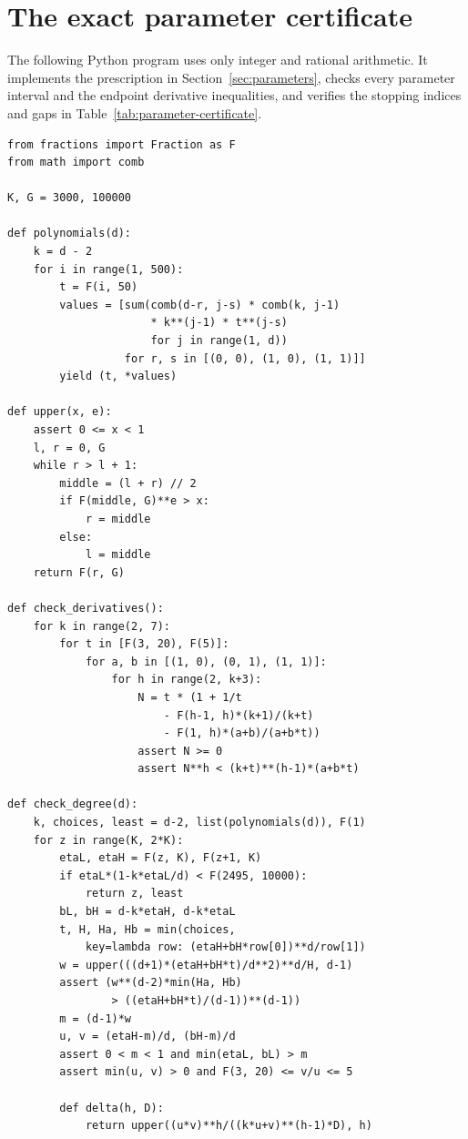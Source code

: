 \section{The exact parameter certificate}
\label{app:certificate}

The following Python program uses only integer and rational arithmetic.
It implements the prescription in Section~\ref{sec:parameters}, checks
every parameter interval and the endpoint derivative inequalities, and
verifies the stopping indices and gaps in
Table~\ref{tab:parameter-certificate}.

\begingroup\footnotesize
\begin{verbatim}
from fractions import Fraction as F
from math import comb

K, G = 3000, 100000

def polynomials(d):
    k = d - 2
    for i in range(1, 500):
        t = F(i, 50)
        values = [sum(comb(d-r, j-s) * comb(k, j-1)
                      * k**(j-1) * t**(j-s)
                      for j in range(1, d))
                  for r, s in [(0, 0), (1, 0), (1, 1)]]
        yield (t, *values)

def upper(x, e):
    assert 0 <= x < 1
    l, r = 0, G
    while r > l + 1:
        middle = (l + r) // 2
        if F(middle, G)**e > x:
            r = middle
        else:
            l = middle
    return F(r, G)

def check_derivatives():
    for k in range(2, 7):
        for t in [F(3, 20), F(5)]:
            for a, b in [(1, 0), (0, 1), (1, 1)]:
                for h in range(2, k+3):
                    N = t * (1 + 1/t
                        - F(h-1, h)*(k+1)/(k+t)
                        - F(1, h)*(a+b)/(a+b*t))
                    assert N >= 0
                    assert N**h < (k+t)**(h-1)*(a+b*t)

def check_degree(d):
    k, choices, least = d-2, list(polynomials(d)), F(1)
    for z in range(K, 2*K):
        etaL, etaH = F(z, K), F(z+1, K)
        if etaL*(1-k*etaL/d) < F(2495, 10000):
            return z, least
        bL, bH = d-k*etaH, d-k*etaL
        t, H, Ha, Hb = min(choices,
            key=lambda row: (etaH+bH*row[0])**d/row[1])
        w = upper(((d+1)*(etaH+bH*t)/d**2)**d/H, d-1)
        assert (w**(d-2)*min(Ha, Hb)
                > ((etaH+bH*t)/(d-1))**(d-1))
        m = (d-1)*w
        u, v = (etaH-m)/d, (bH-m)/d
        assert 0 < m < 1 and min(etaL, bL) > m
        assert min(u, v) > 0 and F(3, 20) <= v/u <= 5

        def delta(h, D):
            return upper((u*v)**h/((k*u+v)**(h-1)*D), h)


\end{verbatim}

